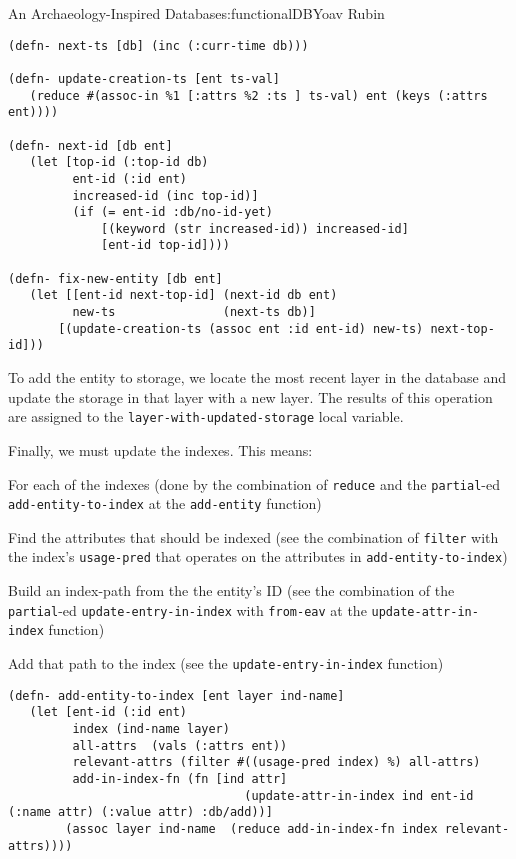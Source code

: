 \begin{aosachapter}{An Archaeology-Inspired Database}{s:functionalDB}{Yoav Rubin}
\begin{verbatim}
(defn- next-ts [db] (inc (:curr-time db)))

(defn- update-creation-ts [ent ts-val]
   (reduce #(assoc-in %1 [:attrs %2 :ts ] ts-val) ent (keys (:attrs ent))))

(defn- next-id [db ent]
   (let [top-id (:top-id db)
         ent-id (:id ent)
         increased-id (inc top-id)]
         (if (= ent-id :db/no-id-yet)
             [(keyword (str increased-id)) increased-id]
             [ent-id top-id])))

(defn- fix-new-entity [db ent]
   (let [[ent-id next-top-id] (next-id db ent)
         new-ts               (next-ts db)]
       [(update-creation-ts (assoc ent :id ent-id) new-ts) next-top-id]))
\end{verbatim}

To add the entity to storage, we locate the most recent layer in the
database and update the storage in that layer with a new layer. The
results of this operation are assigned to the
\texttt{layer-with-updated-storage} local variable.

Finally, we must update the indexes. This means:

\begin{aosaitemize}

\item
  For each of the indexes (done by the combination of \texttt{reduce}
  and the \texttt{partial}-ed \texttt{add-entity-to-index} at the
  \texttt{add-entity} function)

  \begin{aosaitemize}
  
  \item
    Find the attributes that should be indexed (see the combination of
    \texttt{filter} with the index's \texttt{usage-pred} that operates
    on the attributes in \texttt{add-entity-to-index})
  \item
    Build an index-path from the the entity's ID (see the combination of
    the \texttt{partial}-ed \texttt{update-entry-in-index} with
    \texttt{from-eav} at the \texttt{update-attr-in-index} function)
  \item
    Add that path to the index (see the \texttt{update-entry-in-index}
    function)
  \end{aosaitemize}
\end{aosaitemize}

\begin{verbatim}
(defn- add-entity-to-index [ent layer ind-name]
   (let [ent-id (:id ent)
         index (ind-name layer)
         all-attrs  (vals (:attrs ent))
         relevant-attrs (filter #((usage-pred index) %) all-attrs)
         add-in-index-fn (fn [ind attr] 
                                 (update-attr-in-index ind ent-id (:name attr) (:value attr) :db/add))]
        (assoc layer ind-name  (reduce add-in-index-fn index relevant-attrs))))


\end{verbatim}
\end{aosachapter}
